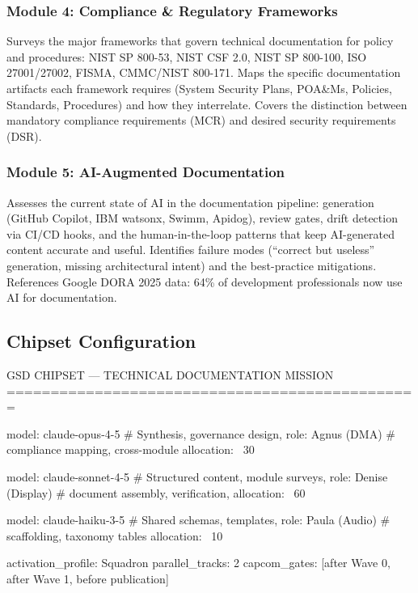 \documentclass[11pt,letterpaper]{article}
\begin{document}
\subsubsection{Module 4: Compliance \& Regulatory Frameworks}
Surveys the major frameworks that govern technical documentation for policy and procedures: NIST SP 800-53, NIST CSF 2.0, NIST SP 800-100, ISO 27001/27002, FISMA, CMMC/NIST 800-171. Maps the specific documentation artifacts each framework requires (System Security Plans, POA\&Ms, Policies, Standards, Procedures) and how they interrelate. Covers the distinction between mandatory compliance requirements (MCR) and desired security requirements (DSR).

\subsubsection{Module 5: AI-Augmented Documentation}
Assesses the current state of AI in the documentation pipeline: generation (GitHub Copilot, IBM watsonx, Swimm, Apidog), review gates, drift detection via CI/CD hooks, and the human-in-the-loop patterns that keep AI-generated content accurate and useful. Identifies failure modes (``correct but useless'' generation, missing architectural intent) and the best-practice mitigations. References Google DORA 2025 data: 64\% of development professionals now use AI for documentation.

\subsection{Chipset Configuration}

\begin{asciibox}
GSD CHIPSET — TECHNICAL DOCUMENTATION MISSION
===============================================

  model: claude-opus-4-5     # Synthesis, governance design,
  role: Agnus (DMA)          # compliance mapping, cross-module
  allocation: ~30%

  model: claude-sonnet-4-5   # Structured content, module surveys,
  role: Denise (Display)     # document assembly, verification,
  allocation: ~60%

  model: claude-haiku-3-5    # Shared schemas, templates,
  role: Paula (Audio)        # scaffolding, taxonomy tables
  allocation: ~10%

  activation_profile: Squadron
  parallel_tracks: 2
  capcom_gates: [after Wave 0, after Wave 1, before publication]
\end{asciibox}
\end{document}
